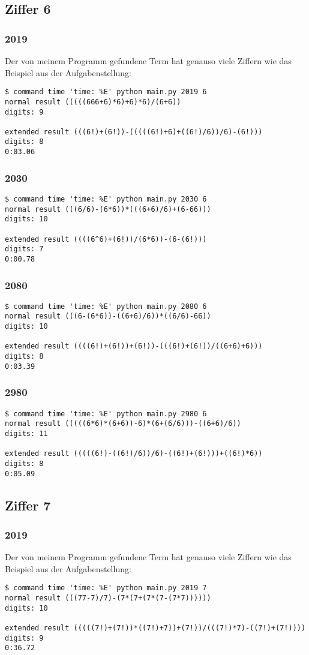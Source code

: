 \subsection{Ziffer 6}
\subsubsection{2019}
Der von meinem Programm gefundene Term hat genauso viele Ziffern wie das Beispiel aus der Aufgabenstellung:
\begin{lstlisting}
$ command time 'time: %E' python main.py 2019 6
normal result (((((666+6)*6)+6)*6)/(6+6))
digits: 9

extended result (((6!)+(6!))-(((((6!)+6)+((6!)/6))/6)-(6!)))
digits: 8
0:03.06
\end{lstlisting}
\subsubsection{2030}
\begin{lstlisting}
$ command time 'time: %E' python main.py 2030 6
normal result (((6/6)-(6*6))*(((6+6)/6)+(6-66)))
digits: 10

extended result ((((6^6)+(6!))/(6*6))-(6-(6!)))
digits: 7
0:00.78
\end{lstlisting}
\subsubsection{2080}
\begin{lstlisting}
$ command time 'time: %E' python main.py 2080 6
normal result (((6-(6*6))-((6+6)/6))*((6/6)-66))
digits: 10

extended result ((((6!)+(6!))+(6!))-(((6!)+(6!))/((6+6)+6)))
digits: 8
0:03.39
\end{lstlisting}
\subsubsection{2980}
\begin{lstlisting}
$ command time 'time: %E' python main.py 2980 6
normal result (((((6*6)*(6+6))-6)*(6+(6/6)))-((6+6)/6))
digits: 11

extended result (((((6!)-((6!)/6))/6)-((6!)+(6!)))+((6!)*6))
digits: 8
0:05.09
\end{lstlisting}
\subsection{Ziffer 7}
\subsubsection{2019}
Der von meinem Programm gefundene Term hat genauso viele Ziffern wie das Beispiel aus der Aufgabenstellung:
\begin{lstlisting}
$ command time 'time: %E' python main.py 2019 7
normal result (((77-7)/7)-(7*(7+(7*(7-(7*7))))))
digits: 10

extended result (((((7!)+(7!))*((7!)+7))+(7!))/(((7!)*7)-((7!)+(7!))))
digits: 9
0:36.72
\end{lstlisting}

